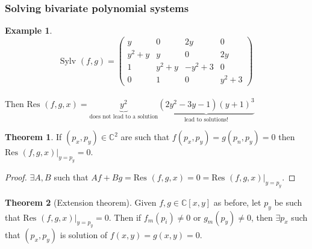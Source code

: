 \documentclass{article}
\theoremstyle{definition}
\newtheorem{thm}{Theorem}
\newtheorem{ex}{Example}
\newcommand{\C}{\mathbb{C}}
\newcommand{\Res}{\text{Res }}
\newcommand{\Sylv}{\text{Sylv }}
\begin{document}
\subsubsection{Solving bivariate polynomial systems}
\begin{ex}
	
	$$\Sylv(f,g)=\begin{pmatrix}
		y&0&2y&0\\
		y^2+y&y&0&2y\\
		1&y^2+y&-y^2+3&0\\
		0&1&0&y^2+3
	\end{pmatrix}$$\\
	Then $\Res (f,g,x)=\underbrace{y^2}_{\text{does not lead to a solution}}\underbrace{(2y^2-3y-1)(y+1)^3}_\text{lead to solutions!}$
\end{ex}
\begin{thm}
	If $(p_x,p_y)\in\C^2$ are such that $f(p_x,p_y)=g(p_n,p_y)=0$ then $\Res (f,g,x)|_{y=p_y}=0$.
\end{thm}
\begin{proof}
	$\exists A,B$ such that $Af+Bg=\Res(f,g,x)=0=\Res(f,g,x)|_{y=p_y}$.
\end{proof}
\begin{thm}[Extension theorem] Given $f,g\in\C[x,y]$ as before, let $p_y$ be such that $\Res (f,g,x)|_{y=p_y}=0$. Then if $f_m(p_i)\neq 0$ or $g_m(p_y)\neq 0$, then $\exists p_x$ such that $(p_x,p_y)$ is solution of $f(x,y)=g(x,y)=0$.
\end{thm}
\end{document}
